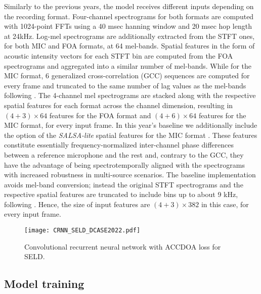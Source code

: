 \documentclass{article}
\begin{document}
\begin{sloppy}
Similarly to the previous years, the model receives different inputs depending on the recording format. Four-channel spectrograms for both formats are computed with 1024-point FFTs using a 40 msec hanning window and 20 msec hop length at 24kHz. Log-mel spectrograms are additionally extracted from the STFT ones, for both MIC and FOA formats, at 64 mel-bands. Spatial features in the form of acoustic intensity vectors for each STFT bin are computed from the FOA spectrograms and aggregated into a similar number of mel-bands. While for the MIC format, 6 generalized cross-correlation (GCC) sequences are computed for every frame and truncated to the same number of lag values as the mel-bands following \cite{Cao2019}. The 4-channel mel spectrograms are stacked along with the respective spatial features for each format across the channel dimension, resulting in $(4+3)\times 64$ features for the FOA format and $(4+6)\times 64$ features for the MIC format, for every input frame. In this year's baseline we additionally include the option of the \emph{SALSA-lite} spatial features for the MIC format \cite{nguyen2022salsa}. These features constitute essentially frequency-normalized inter-channel phase differences between a reference microphone and the rest and, contrary to the GCC, they have the advantage of being spectrotemporally aligned with the spectrograms with increased robustness in multi-source scenarios. The baseline implementation avoids mel-band conversion; instead the original STFT spectrograms and the respective spatial features are truncated to include bins up to about 9 kHz, following \cite{nguyen2022salsa}. Hence, the size of input features are $(4+3)\times 382$ in this case, for every input frame. 

\begin{figure}[t]
  \centering
  \centerline{\texttt{[image: CRNN\_SELD\_DCASE2022.pdf]}} 
  \caption{Convolutional recurrent neural network with ACCDOA loss for SELD.}
  \label{fig:crnn}
\end{figure}

\subsection{Model training}
\label{sec:model_training}


\end{sloppy}
\end{document}
